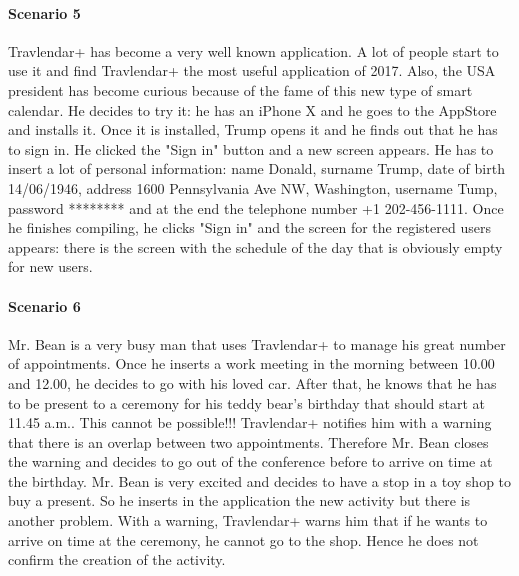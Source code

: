 \documentclass[12pt,titlepage]{article}
\begin{document}
\paragraph{Scenario 5}
Travlendar+ has become a very well known application. A lot of people start to use it and find Travlendar+ the most useful application of 2017. 
Also, the USA president has become curious because of the fame of this new type of smart calendar. He decides to try it: he has an iPhone X and he goes to the AppStore and installs it.
Once it is installed, Trump opens it and he finds out that he has to sign in. He clicked the "Sign in" button and a new screen appears. 
He has to insert a lot of personal information: name Donald, surname Trump, date of birth 14/06/1946, address 1600 Pennsylvania Ave NW, Washington, username Tump, password ******** and at the end the telephone number +1 202-456-1111.
Once he finishes compiling, he clicks "Sign in" and the screen for the registered users appears: there is the screen with the schedule of the day that is obviously empty for new users.

\paragraph{Scenario 6}
Mr. Bean is a very busy man that uses Travlendar+ to manage his great number of appointments. Once he inserts a work meeting in the morning between 10.00 and 12.00, he decides to go with his loved car. After that, he knows that he has to be present to a ceremony for his teddy bear's birthday that should start at 11.45 a.m.. This cannot be possible!!! Travlendar+ notifies him with a warning that there is an overlap between two appointments. Therefore Mr. Bean closes the warning and decides to go out of the conference before to arrive on time at the birthday.
Mr. Bean is very excited and decides to have a stop in a toy shop to buy a present. So he inserts in the application the new activity but there is another problem. With a warning, Travlendar+ warns him that if he wants to arrive on time at the ceremony, he cannot go to the shop. Hence he does not confirm the creation of the activity.
\end{document}

